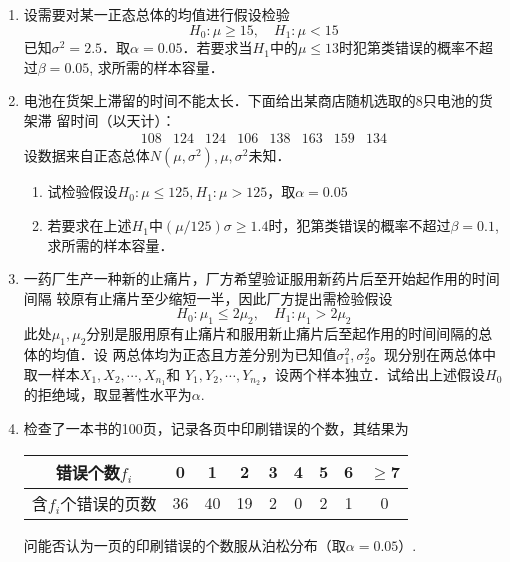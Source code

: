 \documentclass[10pt,a4paper]{article}
\begin{document}
\begin{enumerate}
    \item 设需要对某一正态总体的均值进行假设检验
    $$H_0:\mu \geq 15,\quad H_1:\mu <15$$
    已知$\sigma^2=2.5$．取$\alpha=0.05$．若要求当$H_1$中的$\mu\leq 13$时犯第\uppercase\expandafter{}类错误的概率不超过$\beta=0.05$,
    求所需的样本容量．




    \item 电池在货架上滞留的时间不能太长．下面给出某商店随机选取的8只电池的货架滞
    留时间（以天计）：
    $$\begin{array}{cccccccc}
        108 & 124 & 124 & 106 & 138 & 163 & 159 & 134
    \end{array}$$
    设数据来自正态总体$N(\mu,\sigma^2),\mu,\sigma^2$未知．
    \begin{enumerate}
        \item 试检验假设$H_0:\mu \leq 125,H_1:\mu >125$，取$\alpha=0.05$
        \item 若要求在上述$H_1$中$(\mu/125)\sigma\geq 1.4$时，犯第\uppercase\expandafter{}类错误的概率不超过$\beta=0.1$,
        求所需的样本容量．
    \end{enumerate}




    \item 一药厂生产一种新的止痛片，厂方希望验证服用新药片后至开始起作用的时间间隔
    较原有止痛片至少缩短一半，因此厂方提出需检验假设
    $$H_0:\mu_1\leq 2\mu_2,\quad H_1:\mu_1>2\mu_2$$
    此处$\mu_1,\mu_2$分别是服用原有止痛片和服用新止痛片后至起作用的时间间隔的总体的均值．设
    两总体均为正态且方差分别为已知值$\sigma_1^2,\sigma_2^2$。现分别在两总体中取一样本$X_1,X_2,\cdots,X_{n_1}$和
    $Y_1,Y_2,\cdots,Y_{n_2}$，设两个样本独立．试给出上述假设$H_0$的拒绝域，取显著性水平为$\alpha$.




    \item 检查了一本书的100页，记录各页中印刷错误的个数，其结果为
    \renewcommand{\arraystretch}{1.3} 
    \begin{table}[H]\centering
        \begin{tabular}{c|cccccccc}
        错误个数$f_i$    & 0  & 1  & 2  & 3 & 4 & 5 & 6 & $\geq$7 \\ \hline
        含$f_i$个错误的页数 & 36 & 40 & 19 & 2 & 0 & 2 & 1 & 0      
        \end{tabular}
    \end{table}
    \renewcommand{\arraystretch}{1.0} 
    问能否认为一页的印刷错误的个数服从泊松分布（取$\alpha=0.05$）.






\end{enumerate}
\end{document}
